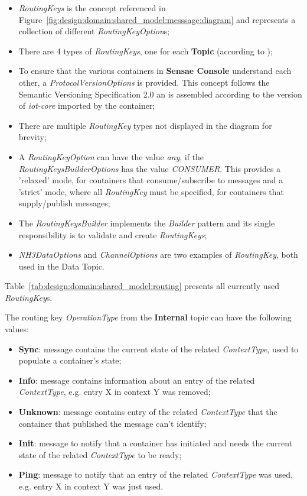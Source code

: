\begin{itemize}
   \item \textit{RoutingKeys} is the concept referenced in Figure~\ref{fig:design:domain:shared_model:messsage:diagram} and represents a collection of different \textit{RoutingKeyOption}s;
   \item There are 4 types of \textit{RoutingKeys}, one for each \textbf{Topic} (according to );
   \item To ensure that the various containers in \textbf{Sensae Console} understand each other, a \textit{ProtocolVersionOptions} is provided. This concept follows the Semantic Versioning Specification 2.0 \parencite{semver} an is assembled according to the version of \textit{iot-core} imported by the container;
   \item There are multiple \textit{RoutingKey} types not displayed in the diagram for brevity;
   \item A \textit{RoutingKeyOption} can have the value \textit{any}, if the \textit{RoutingKeysBuilderOptions} has the value \textit{CONSUMER}. This provides a 'relaxed' mode, for containers that consume/subscribe to messages and a 'strict' mode, where all \textit{RoutingKey} must be specified, for containers that supply/publish messages;
   \item The \textit{RoutingKeysBuilder} implements the \textit{Builder} pattern and its single responsibility is to validate and create \textit{RoutingKeys};
   \item \textit{NH3DataOptions} and \textit{ChannelOptions} are two examples of \textit{RoutingKey}, both used in the Data Topic.
\end{itemize}

Table~\ref{tab:design:domain:shared_model:routing} presents all currently used \textit{RoutingKey}s.

The routing key \textit{OperationType} from the \textbf{Internal} topic can have the following values:

\begin{itemize}
   \item \textbf{Sync}: message contains the current state of the related \textit{ContextType}, used to populate a container's state;
   \item \textbf{Info}: message contains information about an entry of the related \textit{ContextType}, e.g. entry X in context Y was removed;
   \item \textbf{Unknown}: message contains entry of the related \textit{ContextType} that the container that published the message can't identify;
   \item \textbf{Init}: message to notify that a container has initiated and needs the current state of the related \textit{ContextType} to be ready;
   \item \textbf{Ping}: message to notify that an entry of the related \textit{ContextType} was used, e.g. entry X in context Y was just used.
\end{itemize}

